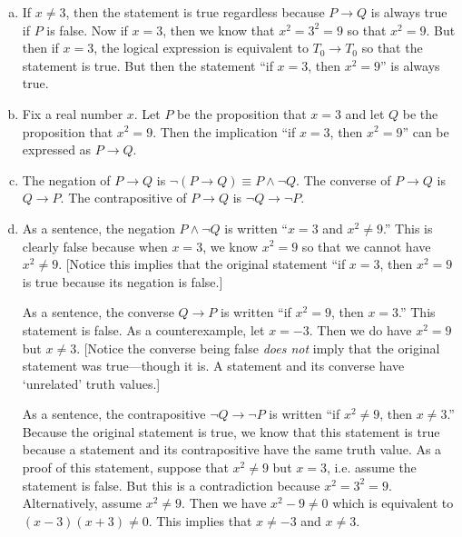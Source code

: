 \documentclass[11pt,letterpaper]{article}
\begin{document}
\sol
\begin{enumerate}[(a)]
\item If $x \neq 3$, then the statement is true regardless because $P \to Q$ is always true if $P$ is false. Now if $x= 3$, then we know that $x^2= 3^2= 9$ so that $x^2= 9$. But then if $x= 3$, the logical expression is equivalent to $T_0 \to T_0$ so that the statement is true. But then the statement ``if $x= 3$, then $x^2= 9$'' is always true. \pspace

\item Fix a real number $x$. Let $P$ be the proposition that $x= 3$ and let $Q$ be the proposition that $x^2= 9$. Then the implication ``if $x= 3$, then $x^2= 9$'' can be expressed as $P \to Q$. \pspace 

\item The negation of $P \to Q$ is $\neg (P \to Q) \equiv P \wedge \neg Q$. The converse of $P \to Q$ is $Q \to P$. The contrapositive of $P \to Q$ is $\neg Q \to \neg P$. \pspace

\item As a sentence, the negation $P \wedge \neg Q$ is written ``$x= 3$ and $x^2 \neq 9$.'' This is clearly false because when $x= 3$, we know $x^2= 9$ so that we cannot have $x^2 \neq 9$. [Notice this implies that the original statement ``if $x= 3$, then $x^2= 9$ is true because its negation is false.] \pspace

As a sentence, the converse $Q \to P$ is written ``if $x^2= 9$, then $x= 3$.'' This statement is false. As a counterexample, let $x= -3$. Then we do have $x^2= 9$ but $x \neq 3$. [Notice the converse being false \textit{does not} imply that the original statement was true---though it is. A statement and its converse have `unrelated' truth values.] \pspace

As a sentence, the contrapositive $\neg Q \to \neg P$ is written ``if $x^2 \neq 9$, then $x \neq 3$.'' Because the original statement is true, we know that this statement is true because a statement and its contrapositive have the same truth value. As a proof of this statement, suppose that $x^2 \neq 9$ but $x= 3$, i.e. assume the statement is false. But this is a contradiction because $x^2= 3^2= 9$. Alternatively, assume $x^2 \neq 9$. Then we have $x^2 - 9 \neq 0$ which is equivalent to $(x - 3)(x + 3) \neq 0$. This implies that $x \neq -3$ and $x \neq 3$. 
\end{enumerate}
\end{document}

